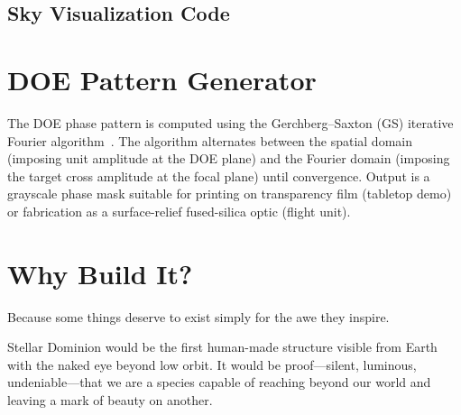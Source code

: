 \documentclass[12pt,letterpaper]{article}
\begin{document}
\subsection{Sky Visualization Code}
\label{sec:code-viz}



\section{DOE Pattern Generator}
\label{sec:code-doe}

The DOE phase pattern is computed using the Gerchberg--Saxton (GS) iterative
Fourier algorithm~\cite{GS1972}. The algorithm alternates between the spatial
domain (imposing unit amplitude at the DOE plane) and the Fourier domain
(imposing the target cross amplitude at the focal plane) until convergence.
Output is a grayscale phase mask suitable for printing on transparency film
(tabletop demo) or fabrication as a surface-relief fused-silica optic (flight
unit).



\section{Why Build It?}

Because some things deserve to exist simply for the awe they inspire.

Stellar Dominion would be the first human-made structure visible from Earth with
the naked eye beyond low orbit. It would be proof---silent, luminous,
undeniable---that we are a species capable of reaching beyond our world and
leaving a mark of beauty on another.
\end{document}
